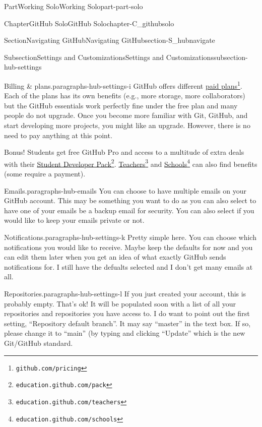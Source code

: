 \documentclass[oneside,10pt,]{book}
\begin{document}
\begin{partptx}{Part}{Working Solo}{}{Working Solo}{}{}{part-part-solo}
\begin{chapterptx}{Chapter}{GitHub Solo}{}{GitHub Solo}{}{}{chapter-C_githubsolo}
\begin{sectionptx}{Section}{Navigating GitHub}{}{Navigating GitHub}{}{}{section-S_hubnavigate}
\begin{subsectionptx}{Subsection}{Settings and Customizations}{}{Settings and Customizations}{}{}{subsection-hub-settings}
\begin{paragraphs}{Billing \& plans.}{paragraphs-hub-settings-i}
GitHub offers different \href{https://github.com/pricing}{paid plans}\footnote{\nolinkurl{github.com/pricing}\label{fn-hub-settings-i-c-b}}. Each of the plans has its own benefits (e.g., more storage, more collaborators) but the GitHub essentials work perfectly fine under the free plan and many people do not upgrade. Once you become more familiar with Git, GitHub, and start developing more projects, you might like an upgrade. However, there is no need to pay anything at this point.%
\par
Bonus! Students get free GitHub Pro and access to a multitude of extra deals with their \href{https://education.github.com/pack}{Student Developer Pack}\footnote{\nolinkurl{education.github.com/pack}\label{fn-hub-settings-i-d-b}}. \href{https://education.github.com/teachers}{Teachers}\footnote{\nolinkurl{education.github.com/teachers}\label{fn-hub-settings-i-d-d}} and \href{https://education.github.com/schools}{Schools}\footnote{\nolinkurl{education.github.com/schools}\label{fn-hub-settings-i-d-f}} can also find benefits (some require a payment).%
\end{paragraphs}%
\begin{paragraphs}{Emails.}{paragraphs-hub-emails}%
%
You can choose to have multiple emails on your GitHub account. This may be something you want to do as you can also select to have one of your emails be a backup email for security. You can also select if you would like to keep your emails private or not.%
\end{paragraphs}%
\begin{paragraphs}{Notifications.}{paragraphs-hub-settings-k}%
%
Pretty simple here. You can choose which notifications you would like to receive. Maybe keep the defaults for now and you can edit them later when you get an idea of what exactly GitHub sends notifications for. I still have the defualts selected and I don't get many emails at all.%
\end{paragraphs}%
\begin{paragraphs}{Repositories.}{paragraphs-hub-settings-l}%
%
%
If you just created your account, this is probably empty. That's ok! It will be populated soon with a list of all your repositories and repositories you have access to. I do want to point out the first setting, ``Repository default branch''. It may say ``master'' in the text box. If so, please change it to ``main'' (by typing and clicking ``Update'' which is the new Git\slash{}GitHub standard.%
\par

\end{paragraphs}
\end{subsectionptx}
\end{sectionptx}
\end{chapterptx}
\end{partptx}
\end{document}
